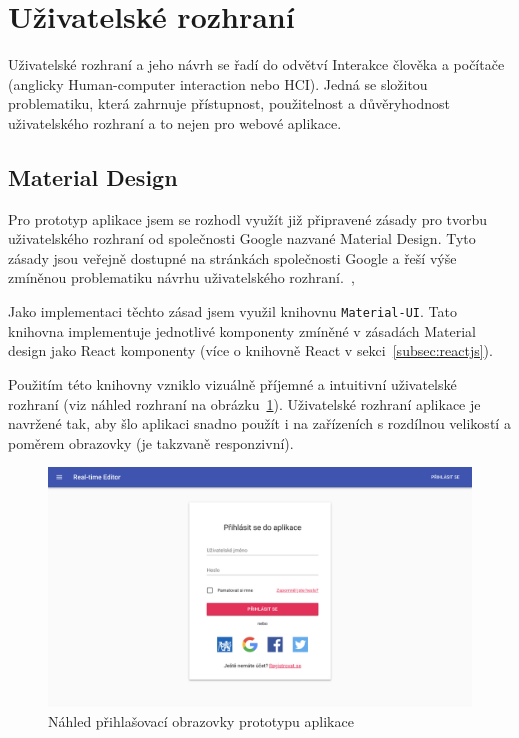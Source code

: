 
\section{Uživatelské rozhraní}\label{sec:uživatelskéRozhraní}

Uživatelské rozhraní a jeho návrh se řadí do odvětví Interakce člověka a počítače (anglicky Human-computer interaction nebo HCI).
Jedná se složitou problematiku, která zahrnuje přístupnost, použitelnost a důvěryhodnost uživatelského rozhraní a to nejen pro webové aplikace.

\subsection{Material Design}\label{subsec:materialDesign}

Pro prototyp aplikace jsem se rozhodl využít již připravené zásady pro tvorbu uživatelského rozhraní od společnosti Google nazvané Material Design.
Tyto zásady jsou veřejně dostupné na stránkách společnosti Google a řeší výše zmíněnou problematiku návrhu uživatelského rozhraní.~\cite{google:md},~\cite{google:mdUsability}

Jako implementaci těchto zásad jsem využil knihovnu \texttt{Material-UI}.
Tato knihovna implementuje jednotlivé komponenty zmíněné v zásadách Material design jako React komponenty (více o knihovně React v sekci~\ref{subsec:reactjs}).

Použitím této knihovny vzniklo vizuálně příjemné a intuitivní uživatelské rozhraní (viz náhled rozhraní na obrázku~\ref{fig:uiScreenshot}).
Uživatelské rozhraní aplikace je navržené tak, aby šlo aplikaci snadno použít i na zařízeních s rozdílnou velikostí a poměrem obrazovky (je takzvaně responzivní).

\begin{figure}[ht!]
    \centering
    \includegraphics[width=\textwidth]{partials/realizace/uiScreenshotCZ.png}
    \caption{Náhled přihlašovací obrazovky prototypu aplikace}\label{fig:uiScreenshot}
\end{figure}

